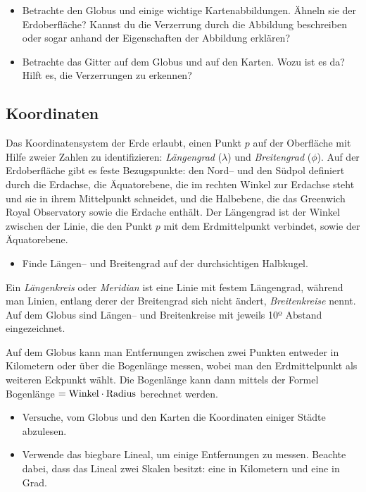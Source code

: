 \documentclass[a4paper,12pt]{article}
\begin{document}
\begin{itemize}
 \item Betrachte den Globus und einige wichtige Kartenabbildungen. Ähneln sie der 
       Erd\-ober\-fläche? Kannst du die Verzerrung durch die Abbildung beschreiben oder 
       sogar anhand der Eigenschaften der Abbildung erklären?
 \item Betrachte das Gitter auf dem Globus und auf den Karten. Wozu ist es da? Hilft es, 
       die Verzerrungen zu erkennen?
\end{itemize}

\subsection*{Koordinaten}

Das Koordinatensystem der Erde erlaubt, einen Punkt $p$ auf der Oberfläche mit Hilfe
zweier Zahlen zu identifizieren: \emph{Längengrad} ($\lambda$) und \emph{Breitengrad} 
($\phi$). Auf der Erdoberfläche gibt es feste Bezugspunkte: den Nord-- und den Südpol 
definiert durch die Erdachse, die Äquatorebene, die im rechten Winkel zur Erdachse steht 
und sie in ihrem Mittelpunkt schneidet, und die Halbebene, die das Greenwich Royal 
Observatory sowie die Erdache enthält. Der Längengrad ist der Winkel zwischen der Linie, 
die den Punkt $p$ mit dem Erdmittelpunkt verbindet, sowie der Äquatorebene.

\begin{itemize}
 \item Finde Längen-- und Breitengrad auf der durchsichtigen Halbkugel.
\end{itemize}

Ein \emph{Längenkreis} oder \emph{Meridian} ist eine Linie mit festem Längengrad, 
während man Linien, entlang derer der Breitengrad sich nicht ändert, \emph{Breitenkreise} 
nennt. Auf dem Globus sind Längen-- und Breitenkreise mit jeweils 10º Abstand 
eingezeichnet.

Auf dem Globus kann man Entfernungen zwischen zwei Punkten entweder in Kilometern oder 
über die Bogenlänge messen, wobei man den Erdmittelpunkt als weiteren Eckpunkt wählt.
Die Bogenlänge kann dann mittels der Formel Bogenlänge $= {\rm Winkel} \cdot  
{\rm Radius}$ berechnet werden.

\begin{itemize}
 \item Versuche, vom Globus und den Karten die Koordinaten einiger Städte abzulesen.
 \item Verwende das biegbare Lineal, um einige Entfernungen zu messen. Beachte dabei,
       dass das Lineal zwei Skalen besitzt: eine in Kilometern und eine in Grad.
\end{itemize}
\end{document}
